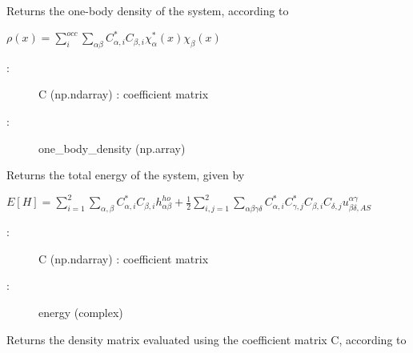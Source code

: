 \documentclass[letterpaper,10pt,english]{sphinxmanual}
\begin{document}
\begin{fulllineitems}
\begin{fulllineitems}
\label{\detokenize{index:do.GHF.eval_one_body_density}}
Returns the one-body density of the system, according to

\(\rho(x) = \sum_i^{occ} \sum_{\alpha\beta} C_{\alpha,i}^* C_{\beta,i} \chi_{\alpha}^*(x) \chi_{\beta}(x)\)
\begin{description}
\item[{:}] \leavevmode
C (np.ndarray) : coefficient matrix

\item[{:}] \leavevmode
one\_body\_density (np.array)

\end{description}

\end{fulllineitems}


\begin{fulllineitems}
\label{\detokenize{index:do.GHF.eval_total_energy}}
Returns the total energy of the system, given by

\(E[H] = \sum_{i=1}^2 \sum_{\alpha,\beta} C_{\alpha,i}^* C_{\beta,i} h_{\alpha\beta}^{ho} + \frac{1}{2} \sum_{i,j=1}^2 \sum_{\alpha\beta\gamma\delta} C_{\alpha,i}^* C_{\gamma,j}^* C_{\beta,i} C_{\delta,j}  u^{\alpha\gamma}_{\beta\delta,AS}\)
\begin{description}
\item[{:}] \leavevmode
C (np.ndarray) : coefficient matrix

\item[{:}] \leavevmode
energy (complex)

\end{description}

\end{fulllineitems}


\begin{fulllineitems}
\label{\detokenize{index:do.GHF.fill_density_matrix}}
Returns the density matrix evaluated using the coefficient matrix C, according to


\end{fulllineitems}
\end{fulllineitems}
\end{document}
